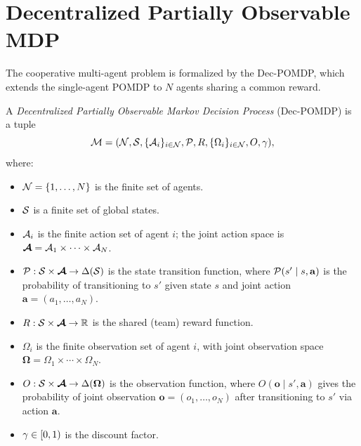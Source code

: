\documentclass[11pt,a4paper]{article}
\begin{document}
\section{Decentralized Partially Observable MDP}
\label{sec:decpomdp}

The cooperative multi-agent problem is formalized by the Dec-POMDP,
which extends the single-agent POMDP to $N$ agents sharing a common
reward.

\begin{definition}
\label{def:decpomdp}
A \emph{Decentralized Partially Observable Markov Decision Process}
(Dec-POMDP) is a tuple
\[
  \mathcal{M} = (\mathcal{N}, \mathcal{S}, \{\mathcal{A}_i\}_{i \in \mathcal{N}},
  \mathcal{P}, R, \{\Omega_i\}_{i \in \mathcal{N}}, O, \gamma),
\]
where:
\begin{itemize}[nosep]
  \item $\mathcal{N} = \{1, \ldots, N\}$ is the finite set of agents.
  \item $\mathcal{S}$ is a finite set of global states.
  \item $\mathcal{A}_i$ is the finite action set of agent $i$; the joint
    action space is $\boldsymbol{\mathcal{A}} = \mathcal{A}_1 \times \cdots \times \mathcal{A}_N$.
  \item $\mathcal{P} : \mathcal{S} \times \boldsymbol{\mathcal{A}} \to \Delta(\mathcal{S})$
    is the state transition function, where $\mathcal{P}(s' \mid s, \mathbf{a})$
    is the probability of transitioning to $s'$ given state $s$ and
    joint action $\mathbf{a} = (a_1, \ldots, a_N)$.
  \item $R : \mathcal{S} \times \boldsymbol{\mathcal{A}} \to \mathbb{R}$ is the shared
    (team) reward function.
  \item $\Omega_i$ is the finite observation set of agent $i$, with
    joint observation space $\boldsymbol{\Omega} = \Omega_1 \times
    \cdots \times \Omega_N$.
  \item $O : \mathcal{S} \times \boldsymbol{\mathcal{A}} \to \Delta(\boldsymbol{\Omega})$
    is the observation function, where $O(\mathbf{o} \mid s', \mathbf{a})$
    gives the probability of joint observation $\mathbf{o} = (o_1,
    \ldots, o_N)$ after transitioning to $s'$ via action $\mathbf{a}$.
  \item $\gamma \in [0, 1)$ is the discount factor.
\end{itemize}
\end{definition}
\end{document}
